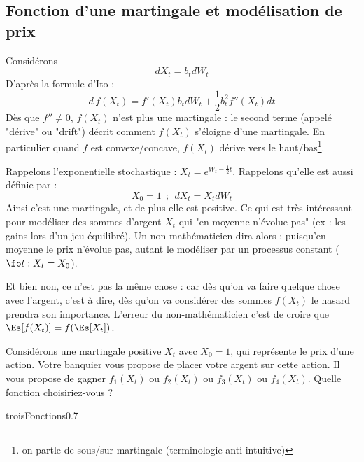 \documentclass{article}
\begin{document}






\subsection{Fonction d'une martingale et  modélisation de prix}

Considérons 
$$
dX_t=  b_t dW_t
$$
D'après la formule d'Ito : 
$$
d\, f(X_t) =  f'(X_t) b_t dW_t + \frac 12 b_t^2 f''(X_t)dt 
$$
Dès que $f''\neq0$,  $f(X_t)$ n'est plus une martingale :  le second terme (appelé "dérive" ou "drift") décrit comment $f(X_t)$  s'éloigne d'une martingale.  En particulier quand $f$ est convexe/concave, $f(X_t)$ dérive vers le haut/bas\footnote{on partle de sous/sur martingale (terminologie anti-intuitive)}. 


Rappelons l'exponentielle stochastique : $X_t = e^{W_t-\frac 12 t }$. Rappelons qu'elle est aussi définie par :
$$
X_0=1 \ \ ; \ \ dX_t = X_t dW_t       
$$
Ainsi c'est une martingale, et de plus elle est positive. Ce qui est très intéressant pour modéliser des sommes d'argent $X_t$ qui "en moyenne n'évolue pas" (ex : les gains lors d'un jeu équilibré).  Un non-mathématicien dira alors :  puisqu'en moyenne le prix n'évolue pas, autant le modéliser par un processus constant ($\fo t : X_t=X_0$).  

Et bien non, ce n'est pas la même chose : car dès qu'on va faire quelque chose avec l'argent, c'est à dire, dès qu'on va considérer des sommes $f(X_t)$  le hasard prendra son importance. L'erreur du non-mathématicien c'est de croire que $\Es[f(X_t)] = f (\Es[X_t])$.

\begin{exo} Considérons  une martingale positive $X_t$ avec $X_0=1$, qui représente le prix d'une action.  Votre banquier vous propose de placer votre argent sur cette action. Il vous propose de gagner  $f_1(X_t)$ ou  $f_2(X_t)$ ou  $f_3(X_t)$ ou $f_4(X_t)$. Quelle fonction choisiriez-vous ?
\begin{fenetre}{troisFonctions}{0.7}
\end{fenetre}
\end{exo}
\end{document}
